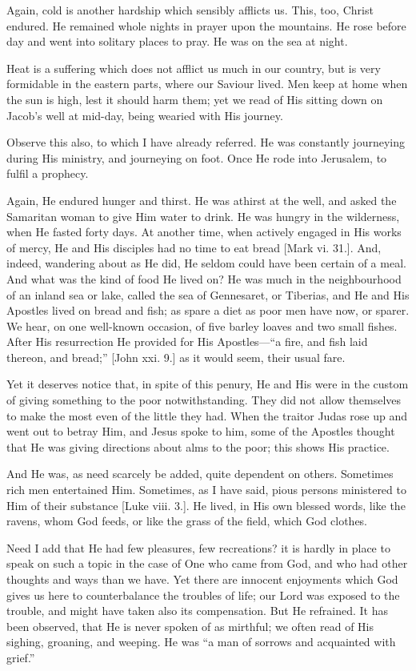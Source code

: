Again, cold is another hardship which sensibly afflicts us. This,
too, Christ endured. He remained whole nights in prayer upon the
mountains. He rose before day and went into solitary places to pray. He
was on the sea at night.

Heat is a suffering which does not afflict us much in our country,
but is very formidable in the eastern parts, where our Saviour lived.
Men keep at home when the sun is high, lest it should harm them; yet we
read of His sitting down on Jacob's well at mid-day, being wearied with
His journey.

Observe this also, to which I have already referred. He was
constantly journeying during His ministry, and journeying on foot. Once
He rode into Jerusalem, to fulfil a prophecy.

Again, He endured hunger and thirst. He was athirst at the well, and
asked the Samaritan woman to give Him water to drink. He was hungry in
the wilderness, when He fasted forty days. At another time, when
actively engaged in His works of mercy, He and His disciples had no time
to eat bread [Mark vi. 31.]. And, indeed, wandering about as He did, He
seldom could have been certain of a meal. And what was the kind of food
He lived on? He was much in the neighbourhood of an inland sea or lake,
called the sea of Gennesaret, or Tiberias, and He and His Apostles lived
on bread and fish; as spare a diet as poor men have now, or sparer. We
hear, on one well-known occasion, of five barley loaves and two small
fishes. After His resurrection He provided for His Apostles—``a
fire, and fish laid thereon, and bread;'' [John xxi. 9.] as it would
seem, their usual fare.

Yet it deserves notice that, in spite of this penury, He and His were
in the custom of giving something to the poor notwithstanding. They did
not allow themselves to make the most even of the little they had. When
the traitor Judas rose up and went out to betray Him, and Jesus spoke to
him, some of the Apostles thought that He was giving directions about
alms to the poor; this shows His practice.

And He was, as need scarcely be added, quite dependent on others.
Sometimes rich men entertained Him. Sometimes, as I have said, pious
persons ministered to Him of their substance [Luke viii. 3.]. He lived,
in His own blessed words, like the ravens, whom God feeds, or like the
grass of the field, which God clothes.

Need I add that He had few pleasures, few recreations? it is hardly
in place to speak on such a topic in the case of One who came from God,
and who had other thoughts and ways than we have. Yet there are innocent
enjoyments which God gives us here to counterbalance the troubles of
life; our Lord was exposed to the trouble, and might have taken also its
compensation. But He refrained. It has been observed, that He is never
spoken of as mirthful; we often read of His sighing, groaning, and
weeping. He was ``a man of sorrows and acquainted with grief.''

